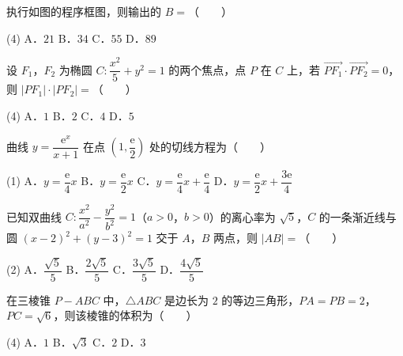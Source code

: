 \begin{question}
执行如图的程序框图，则输出的 $B=$\mbox{（　　）}
\nopagebreak[4]
\begin{center}\end{center}
\nopagebreak[4]
\begin{gkopts}(4)
\task A．$21$
\task B．$34$
\task C．$55$
\task D．$89$
\end{gkopts}

\end{question}
\begin{question}
设 $F_1$，$F_2$ 为椭圆 $C:\dfrac{x^2}{5}+y^2=1$ 的两个焦点，点 $P$ 在 $C$ 上，若 $\overrightarrow{PF_1}\cdot\overrightarrow{PF_2}=0$，则 $|PF_1|\cdot|PF_2|=$\mbox{（　　）}

\begin{gkopts}(4)
\task A．$1$
\task B．$2$
\task C．$4$
\task D．$5$
\end{gkopts}

\end{question}
\begin{question}
曲线 $y=\dfrac{\mathrm e^x}{x+1}$ 在点 $\left(1,\dfrac{\mathrm e}{2}\right)$ 处的切线方程为\mbox{（　　）}

\begin{gkopts}(1)
\task A．$y=\dfrac{\mathrm e}{4}x$
\task B．$y=\dfrac{\mathrm e}{2}x$
\task C．$y=\dfrac{\mathrm e}{4}x+\dfrac{\mathrm e}{4}$
\task D．$y=\dfrac{\mathrm e}{2}x+\dfrac{3\mathrm e}{4}$
\end{gkopts}

\end{question}
\begin{question}
已知双曲线 $C:\dfrac{x^2}{a^2}-\dfrac{y^2}{b^2}=1$（$a>0$，$b>0$）的离心率为 $\sqrt5$，$C$ 的一条渐近线与圆 $(x-2)^2+(y-3)^2=1$ 交于 $A$，$B$ 两点，则 $|AB|=$\mbox{（　　）}

\begin{gkopts}(2)
\task A．$\dfrac{\sqrt5}{5}$
\task B．$\dfrac{2\sqrt5}{5}$
\task C．$\dfrac{3\sqrt5}{5}$
\task D．$\dfrac{4\sqrt5}{5}$
\end{gkopts}

\end{question}
\begin{question}
在三棱锥 $P-ABC$ 中，$\triangle ABC$ 是边长为 $2$ 的等边三角形，$PA=PB=2$，$PC=\sqrt6$，则该棱锥的体积为\mbox{（　　）}

\begin{gkopts}(4)
\task A．$1$
\task B．$\sqrt3$
\task C．$2$
\task D．$3$
\end{gkopts}

\end{question}
